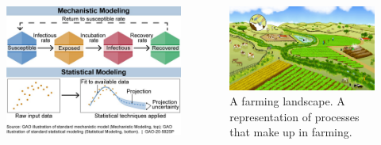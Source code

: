 \documentclass[11pt,dvipsnames,ignorenonframetext,aspectratio=169]{beamer}
\newcommand{\bcolumns}{\begin{columns}[T, onlytextwidth]}
\newcommand{\ecolumns}{\end{columns}}
\begin{document}
\begin{frame}{}
\protect\hypertarget{section-2}{}
\bcolumns
{}

\includegraphics[width=0.95\linewidth]{../images/mechanistic_modeling_COVID_USE}


\begin{figure}
\includegraphics[width=0.92\linewidth]{../images/farminglandscape-numbered-850} \caption{A farming landscape. A representation of processes that make up in farming.}\label{fig:farming-landscape}
\end{figure}

\ecolumns
\end{frame}
\end{document}
